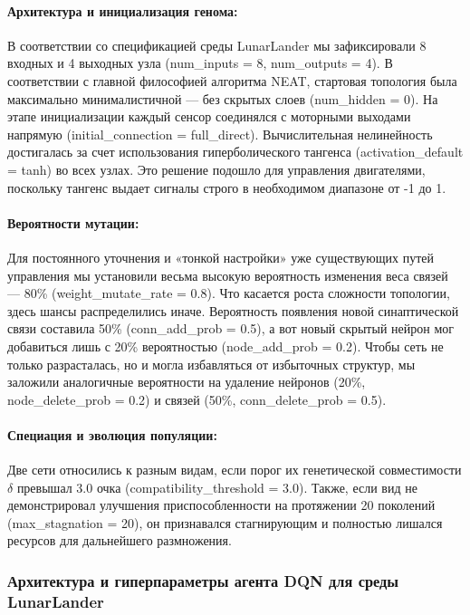 \paragraph{Архитектура и инициализация генома:}

В соответствии со спецификацией среды LunarLander мы зафиксировали 8 входных и 4 выходных узла (num\_inputs = 8, num\_outputs = 4). В соответствии с главной философией алгоритма NEAT, стартовая топология была максимально минималистичной — без скрытых слоев (num\_hidden = 0). На этапе инициализации каждый сенсор соединялся с моторными выходами напрямую (initial\_connection = full\_direct). Вычислительная нелинейность достигалась за счет использования гиперболического тангенса (activation\_default = tanh) во всех узлах. Это решение подошло для управления двигателями, поскольку тангенс выдает сигналы строго в необходимом диапазоне от -1 до 1.

\paragraph{Вероятности мутации:}

Для постоянного уточнения и «тонкой настройки» уже существующих путей управления мы установили весьма высокую вероятность изменения веса связей — 80\% (weight\_mutate\_rate = 0.8). Что касается роста сложности топологии, здесь шансы распределились иначе. Вероятность появления новой синаптической связи составила 50\% (conn\_add\_prob = 0.5), а вот новый скрытый нейрон мог добавиться лишь с 20\% вероятностью (node\_add\_prob = 0.2). Чтобы сеть не только разрасталась, но и могла избавляться от избыточных структур, мы заложили аналогичные вероятности на удаление нейронов (20\%, node\_delete\_prob = 0.2) и связей (50\%, conn\_delete\_prob = 0.5).

\paragraph{Специация и эволюция популяции:}

Две сети относились к разным видам, если порог их генетической совместимости $\delta$ превышал 3.0 очка (compatibility\_threshold = 3.0). Также, если вид не демонстрировал улучшения приспособленности на протяжении 20 поколений (max\_stagnation = 20), он признавался стагнирующим и полностью лишался ресурсов для дальнейшего размножения.  


\subsubsection{Архитектура и гиперпараметры агента DQN для среды LunarLander}

